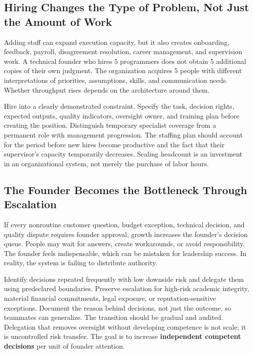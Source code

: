 \subsection{Hiring Changes the Type of Problem, Not Just the Amount of Work}
\label{sec:hiring_changes_problem_type}

Adding staff can expand execution capacity, but it also creates onboarding, feedback, payroll, disagreement resolution, career management, and supervision work. A technical founder who hires 5 programmers does not obtain 5 additional copies of their own judgment. The organization acquires 5 people with different interpretations of priorities, assumptions, skills, and communication needs. Whether throughput rises depends on the architecture around them.

Hire into a clearly demonstrated constraint. Specify the task, decision rights, expected outputs, quality indicators, oversight owner, and training plan before creating the position. Distinguish temporary specialist coverage from a permanent role with management progression. The staffing plan should account for the period before new hires become productive and the fact that their supervisor's capacity temporarily decreases. Scaling headcount is an investment in an organizational system, not merely the purchase of labor hours.

\subsection{The Founder Becomes the Bottleneck Through Escalation}
\label{sec:founder_bottleneck_escalation}

If every nonroutine customer question, budget exception, technical decision, and quality dispute requires founder approval, growth increases the founder's decision queue. People may wait for answers, create workarounds, or avoid responsibility. The founder feels indispensable, which can be mistaken for leadership success. In reality, the system is failing to distribute authority.

Identify decisions repeated frequently with low downside risk and delegate them using predeclared boundaries. Preserve escalation for high-risk academic integrity, material financial commitments, legal exposure, or reputation-sensitive exceptions. Document the reason behind decisions, not just the outcome, so teammates can generalize. The transition should be gradual and audited. Delegation that removes oversight without developing competence is not scale; it is uncontrolled risk transfer. The goal is to increase \textbf{independent competent decisions} per unit of founder attention.

